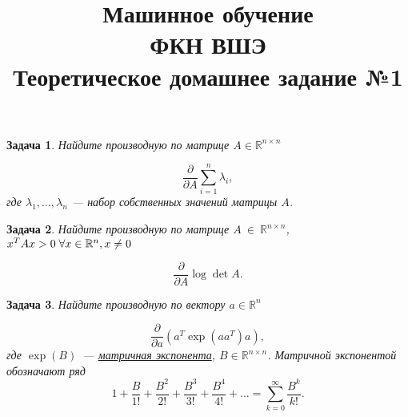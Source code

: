 \documentclass[12pt,fleqn]{article}
\newtheorem{esProblem}{Задача}
\begin{document}
\title{Машинное обучение\\ФКН ВШЭ\\Теоретическое домашнее задание №1}

\date{}

\author{}

\maketitle


\begin{esProblem}
    Найдите производную по матрице $A \in \mathbb{R}^{n\times n}$

    \begin{equation*}
        \frac{\partial}{\partial A} \sum_{i=1}^n \lambda_i,
    \end{equation*}
    где $\lambda_1, \dots, \lambda_n$ --- набор собственных значений матрицы $A$.
\end{esProblem}

\begin{esProblem}
    Найдите производную по матрице $A~\in~\mathbb{R}^{n\times n}$, $x^T Ax > 0 \thickspace \forall x \in \mathbb{R}^n, x \neq 0$

    \begin{equation*}
        \frac{\partial}{\partial A} \log \det A.
    \end{equation*}
\end{esProblem}

\begin{esProblem}

    Найдите производную по вектору $a \in \mathbb{R}^{n}$

    \begin{equation*}
        \frac{\partial}{\partial a} \left(
            a^T \exp(a a^T)a
        \right),
    \end{equation*}
    где $\exp(B)$~--- \href{https://en.wikipedia.org/wiki/Matrix_exponential}{матричная экспонента},
    $B \in \mathbb{R}^{n \times n}$.
    Матричной экспонентой обозначают ряд
    \begin{equation*}
        1 + \frac{B}{1!} + \frac{B^2}{2!} + \frac{B^3}{3!} + \frac{B^4}{4!} + \ldots = \sum_{k=0}^\infty \frac{B^k}{k!} .
    \end{equation*}
\end{esProblem}
\end{document}
